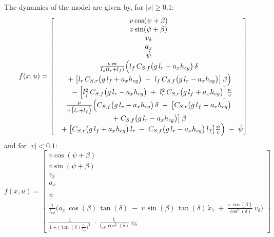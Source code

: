 The dynamics of the model are given by, for $|v|\geq0.1$:
\[
	f(x, u) = \begin{bmatrix}
		v\cos(\psi + \beta)                                  \\
		v\sin(\psi + \beta)                                  \\
		v_\delta                                             \\
		a_x                                                  \\
		\dot{\psi}                                           \\
		\frac{\mu\,m}{I_{z}(l_{r}+l_{f})}\Bigl(
		l_{f}\,C_{S,f}\bigl(g\,l_{r}-a_xh_{cg}\bigr)\,\delta \\
		\;+                                                 \;\bigl[l_{r}\,C_{S,r}\bigl(g\,l_{f}+a_xh_{cg}\bigr)
			\;-\;l_{f}\,C_{S,f}\bigl(g\,l_{r}-a_xh_{cg}\bigr)\bigr]\,\beta
		\Bigr)                                               \\
		\quad -\;\Bigl[
		l_{f}^{2}\,C_{S,f}\bigl(g\,l_{r}-a_xh_{cg}\bigr)
		\;+\;
		l_{r}^{2}\,C_{S,r}\bigl(g\,l_{f}+a_xh_{cg}\bigr)
		\Bigr]
		\frac{\dot{\psi}}{v}                                 \\
		\frac{\mu}{v\,\bigl(l_{r}+l_{f}\bigr)}\Bigl(
		C_{S,f}\bigl(g\,l_{r}-a_xh_{cg}\bigr)\,\delta
		\;-\;
		\bigl[C_{S,r}\bigl(g\,l_{f}+a_xh_{cg}\bigr)          \\
			\;+\;
		C_{S,f}\bigl(g\,l_{r}-a_xh_{cg}\bigr)\bigr]\,\beta   \\
		\quad +\;\bigl[
			C_{S,r}\bigl(g\,l_{f}+a_xh_{cg}\bigr)\,l_{r}
			\;-\;
			C_{S,f}\bigl(g\,l_{r}-a_xh_{cg}\bigr)\,l_{f}
			\bigr]
		\frac{\dot{\psi}}{v}
		\Bigr)
		\;-\;
		\dot{\psi}
	\end{bmatrix}
\]
and for $|v|<0.1$:
\[
	f(x, u) = \begin{bmatrix}
		v\cos(\psi + \beta) \\
		v\sin(\psi + \beta) \\
		v_\delta            \\
		a_x                 \\
		\dot{\psi}          \\
		\frac{1}{l_{wb}}
		\biggl(
		a_x\,\cos( \beta)\,\tan(\delta)
		\;-\;
		v\,\sin( \beta)\,\tan(\delta)\,\dot{x}_{7}
		\;+\;
		\frac{v\,\cos( \beta)}{\cos^2(\delta)}\,
		v_{\delta}
		\biggr)
		\\
		\frac{1}{1 +
			\bigl(\tan(\delta)\tfrac{l_{r}}{l_{wb}}\bigr)^2}
		\;\cdot\;
		\frac{l_{r}}{l_{wb}\,\cos^2(\delta)}\,
		v_{\delta}
	\end{bmatrix}
\]

